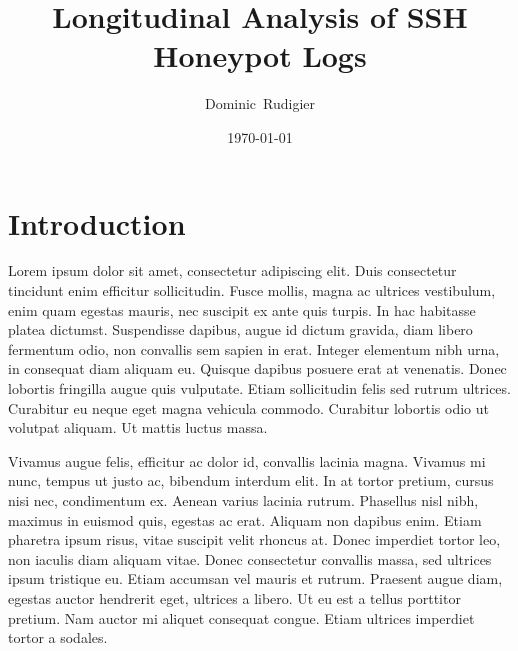 \documentclass{plmmthesis}
\title{Longitudinal Analysis of SSH Honeypot Logs}                %
\author{Dominic~Rudigier}      %
\date{\today}
\institute{Department of Computer Science, Security and Privacy Lab}
\begin{document}

\maketitle


\tableofcontents 

\listoffigures        \cleardoublepage  %
\listoftables         \cleardoublepage  %


\chapter{Introduction}

Lorem ipsum dolor sit amet, consectetur adipiscing elit. Duis consectetur tincidunt enim efficitur sollicitudin. Fusce mollis, magna ac ultrices vestibulum, enim quam egestas mauris, nec suscipit ex ante quis turpis. In hac habitasse platea dictumst. Suspendisse dapibus, augue id dictum gravida, diam libero fermentum odio, non convallis sem sapien in erat. Integer elementum nibh urna, in consequat diam aliquam eu. Quisque dapibus posuere erat at venenatis. Donec lobortis fringilla augue quis vulputate. Etiam sollicitudin felis sed rutrum ultrices. Curabitur eu neque eget magna vehicula commodo. Curabitur lobortis odio ut volutpat aliquam. Ut mattis luctus massa.

Vivamus augue felis, efficitur ac dolor id, convallis lacinia magna. Vivamus mi nunc, tempus ut justo ac, bibendum interdum elit. In at tortor pretium, cursus nisi nec, condimentum ex. Aenean varius lacinia rutrum. Phasellus nisl nibh, maximus in euismod quis, egestas ac erat. Aliquam non dapibus enim. Etiam pharetra ipsum risus, vitae suscipit velit rhoncus at. Donec imperdiet tortor leo, non iaculis diam aliquam vitae. Donec consectetur convallis massa, sed ultrices ipsum tristique eu. Etiam accumsan vel mauris et rutrum. Praesent augue diam, egestas auctor hendrerit eget, ultrices a libero. Ut eu est a tellus porttitor pretium. Nam auctor mi aliquet consequat congue. Etiam ultrices imperdiet tortor a sodales.
\end{document}
